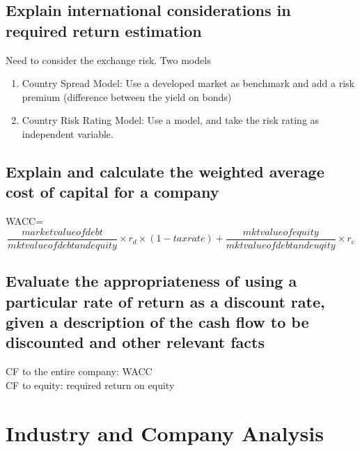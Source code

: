 \documentclass{article}
\newcommand{\be}{\begin{enumerate}}
\newcommand{\ee}{\end{enumerate}}
\begin{document}
\subsection{Explain international considerations in required return estimation}
Need to consider the exchange risk. Two models
\be
    \item Country Spread Model: Use a developed market as benchmark and add a risk premium
        (difference between the yield on bonds)
    \item Country Risk Rating Model: Use a model, and take the risk rating as 
        independent variable.
\ee
\subsection{Explain and calculate the weighted average cost of capital for a company}
WACC=
$$
    \frac{market value of debt}{mkt value of debt and equity}\times r_d \times(1-tax rate)
    +\frac{mkt value of equity}{mkt value of debt and euqity}\times r_e
$$
\subsection{Evaluate the appropriateness of using a particular rate of return as
a discount rate, given a description of the cash flow to be discounted and other
relevant facts}
CF to the entire company: WACC
\\CF to equity: required return on equity


\section{Industry and Company Analysis}
\end{document}
